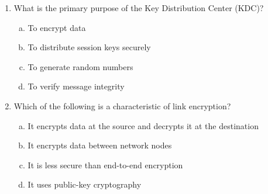 \documentclass[12pt]{article}
\begin{document}
\begin{enumerate}
    \item What is the primary purpose of the Key Distribution Center (KDC)?
    \begin{enumerate}[(a)]
        \item To encrypt data
        \item To distribute session keys securely
        \item To generate random numbers
        \item To verify message integrity
    \end{enumerate}

    \item Which of the following is a characteristic of link encryption?
    \begin{enumerate}[(a)]
        \item It encrypts data at the source and decrypts it at the destination
        \item It encrypts data between network nodes
        \item It is less secure than end-to-end encryption
        \item It uses public-key cryptography
    \end{enumerate}
\end{enumerate}
\newpage
\end{document}
